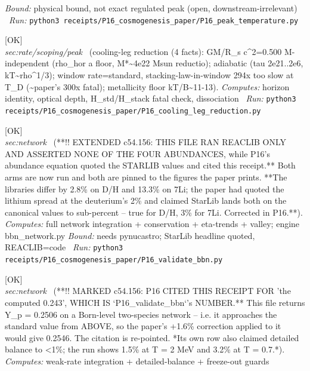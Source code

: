 \begin{description}
 \emph{Bound:} physical bound, not exact regulated peak (open, downstream-irrelevant)
\ \emph{Run:} \texttt{python3 receipts/P16\_cosmogenesis\_paper/P16\_peak\_temperature.py}
\item[\label{rcpt:P16_cooling_leg_reduction}\texttt{P16\_cooling\_leg\_reduction}]\hfill\textsf{[OK]}\\
\textit{sec:rate/scoping/peak} \ (cooling-leg reduction (4 facts): GM/R\_s c\textasciicircum{}2=0.500 M-independent (rho\_hor a floor, M*\textasciitilde{}4e22 Msun reductio); adiabatic (tau 2e21..2e6, kT\textasciitilde{}rho\textasciicircum{}1/3); window rate=standard, stacking-law-in-window 294x too slow at T\_D (\textasciitilde{}paper's 300x fatal); metallicity floor kT/B\textasciitilde{}11-13). 
\emph{Computes:} horizon identity, optical depth, H\_std/H\_stack fatal check, dissociation
\ \emph{Run:} \texttt{python3 receipts/P16\_cosmogenesis\_paper/P16\_cooling\_leg\_reduction.py}
\item[\label{rcpt:P16_validate_bbn}\texttt{P16\_validate\_bbn}]\hfill\textsf{[OK]}\\
\textit{sec:network} \ (**!! EXTENDED c54.156: THIS FILE RAN REACLIB ONLY AND ASSERTED NONE OF THE FOUR ABUNDANCES, while P16's abundance equation quoted the STARLIB values and cited this receipt.** Both arms are now run and both are pinned to the figures the paper prints. **The libraries differ by 2.8\% on D/H and 13.3\% on 7Li; the paper had quoted the lithium spread at the deuterium's 2\% and claimed StarLib lands both on the canonical values to sub-percent -- true for D/H, 3\% for 7Li. Corrected in P16.**). 
\emph{Computes:} full network integration + conservation + eta-trends + valley; engine bbn\_network.py
 \emph{Bound:} needs pynucastro; StarLib headline quoted, REACLIB=code
\ \emph{Run:} \texttt{python3 receipts/P16\_cosmogenesis\_paper/P16\_validate\_bbn.py}
\item[\label{rcpt:P16_Yp_freezeout}\texttt{P16\_Yp\_freezeout}]\hfill\textsf{[OK]}\\
\textit{sec:network} \ (**!! MARKED c54.156: P16 CITED THIS RECEIPT FOR 'the computed 0.243', WHICH IS `P16\_validate\_bbn`'s NUMBER.** This file returns Y\_p = 0.2506 on a Born-level two-species network -- i.e. it approaches the standard value from ABOVE, so the paper's +1.6\% correction applied to it would give 0.2546. The citation is re-pointed. *Its own row also claimed detailed balance to <1\%; the run shows 1.5\% at T = 2 MeV and 3.2\% at T = 0.7.*). 
\emph{Computes:} weak-rate integration + detailed-balance + freeze-out guards

\end{description}

